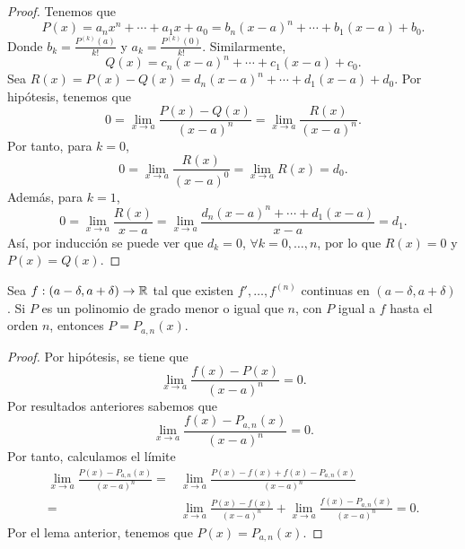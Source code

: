 \begin{proof}
Tenemos que 
\[P\left(x\right) = a_{n}x^{n} + \cdots + a_{1}x + a_{0} = b_{n}\left(x-a\right)^{n} + \cdots + b_{1}\left(x-a\right) + b_{0} .\]
Donde $\displaystyle b_{k} = \frac{P^{\left(k\right)}\left(a\right)}{k!} $ y $\displaystyle a_{k} = \frac{P^{\left(k\right)}\left(0\right)}{k!} $. Similarmente,
\[Q\left(x\right) = c_{n}\left(x-a\right)^{n} + \cdots + c_{1}\left(x-a\right) + c_{0} .\]
Sea $\displaystyle R\left(x\right) = P\left(x\right)-Q\left(x\right) = d _{n}\left(x-a\right)^{n} + \cdots + d _{1}\left(x-a\right) + d _{0} $. Por hipótesis, tenemos que
\[0 = \lim_{x \to a}\frac{P\left(x\right)-Q\left(x\right)}{\left(x-a\right)^{n}} = \lim_{x \to a}\frac{R\left(x\right)}{\left(x-a\right)^{n}} .\]
Por tanto, para $\displaystyle k= 0 $,
\[0 = \lim_{x \to a}\frac{R\left(x\right)}{\left(x-a\right)^{0}} = \lim_{x \to a}R\left(x\right) = d _{0} .\]
Además, para $\displaystyle k= 1 $,
\[0 = \lim_{x \to a} \frac{R\left(x\right)}{x-a} = \lim_{x \to a}\frac{d _{n}\left(x-a\right)^{n} + \cdots + d _{1}\left(x-a\right)}{x-a} = d _{1}.\]
Así, por inducción se puede ver que $\displaystyle d _{k} = 0 $, $\displaystyle \forall k= 0, \ldots, n $, por lo que $\displaystyle R\left(x\right)=0 $ y $\displaystyle P\left(x\right) = Q\left(x\right) $.
\end{proof}
\begin{ftheorem}[]
\normalfont Sea $\displaystyle f : \left(a -\delta, a + \delta \right)\to \mathbb{R} $ tal que existen $\displaystyle f', \ldots, f^{\left(n\right)} $ continuas en $\displaystyle \left(a-\delta, a + \delta \right) $. Si $\displaystyle P $ es un polinomio de grado menor o igual que $\displaystyle n $, con $\displaystyle P $ igual a $\displaystyle f $ hasta el orden $\displaystyle n $, entonces $\displaystyle P = P_{a,n}\left(x\right) $.
\end{ftheorem}
\begin{proof}
Por hipótesis, se tiene que 
\[\lim_{x \to a}\frac{f\left(x\right)-P\left(x\right)}{\left(x-a\right)^{n}} = 0 .\]
Por resultados anteriores sabemos que 
\[\lim_{x \to a}\frac{f\left(x\right)-P_{a,n}\left(x\right)}{\left(x-a\right)^{n}} = 0 .\]
Por tanto, calculamos el límite
\[
\begin{split}
	\lim_{x \to a}\frac{P\left(x\right)-P_{a,n}\left(x\right)}{\left(x-a\right)^{n}} = & \lim_{x \to a}\frac{P\left(x\right)-f\left(x\right) + f\left(x\right)-P_{a,n}\left(x\right)}{\left(x-a\right)^{n}} \\
	= &  \lim_{x \to a}\frac{P\left(x\right)-f\left(x\right)}{\left(x-a\right)^{n}} + \lim_{x \to a}\frac{f\left(x\right)-P_{a,n}\left(x\right)}{\left(x-a\right)^{n}} = 0 .
\end{split}
\]
Por el lema anterior, tenemos que $\displaystyle P\left(x\right) = P_{a,n}\left(x\right) $.
\end{proof}
